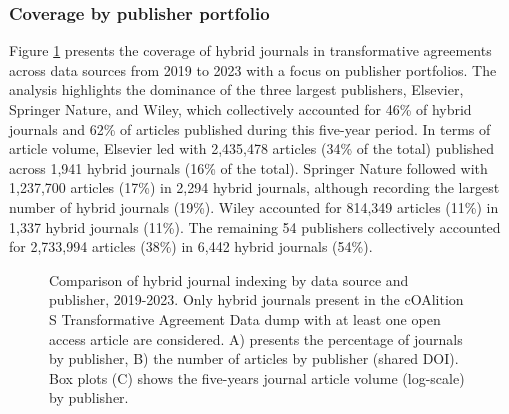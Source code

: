 \documentclass[a4paper,man,floatsintext,longtable,noextraspace,10pt]{apa6}
\begin{document}
\subsubsection{Coverage by publisher
portfolio}\label{coverage-by-publisher-portfolio}

Figure \ref{fig-upset_coverage_results_publisher} presents the coverage
of hybrid journals in transformative agreements across data sources from
2019 to 2023 with a focus on publisher portfolios. The analysis
highlights the dominance of the three largest publishers, Elsevier,
Springer Nature, and Wiley, which collectively accounted for 46\% of
hybrid journals and 62\% of articles published during this five-year
period. In terms of article volume, Elsevier led with 2,435,478 articles
(34\% of the total) published across 1,941 hybrid journals (16\% of the
total). Springer Nature followed with 1,237,700 articles (17\%) in 2,294
hybrid journals, although recording the largest number of hybrid
journals (19\%). Wiley accounted for 814,349 articles (11\%) in 1,337
hybrid journals (11\%). The remaining 54 publishers collectively
accounted for 2,733,994 articles (38\%) in 6,442 hybrid journals (54\%).

\begin{figure}[ht!]


\caption{\label{fig-upset_coverage_results_publisher}Comparison of
hybrid journal indexing by data source and publisher, 2019-2023. Only
hybrid journals present in the cOAlition S Transformative Agreement Data
dump with at least one open access article are considered. A) presents
the percentage of journals by publisher, B) the number of articles by
publisher (shared DOI). Box plots (C) shows the five-years journal
article volume (log-scale) by publisher.}

\end{figure}%
\end{document}
